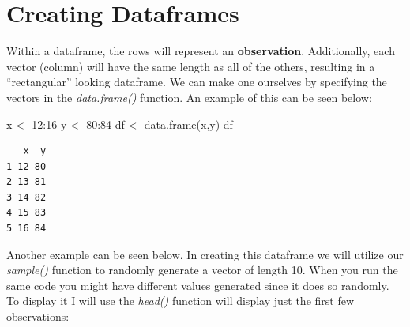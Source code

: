 \documentclass[
  letterpaper,
  DIV=11,
  numbers=noendperiod]{scrreprt}
\newenvironment{Shaded}{\begin{snugshade}}{\end{snugshade}}
\newcommand{\DecValTok}[1]{\textcolor[rgb]{0.68,0.00,0.00}{#1}}
\newcommand{\FunctionTok}[1]{\textcolor[rgb]{0.28,0.35,0.67}{#1}}
\newcommand{\NormalTok}[1]{\textcolor[rgb]{0.00,0.23,0.31}{#1}}
\newcommand{\OtherTok}[1]{\textcolor[rgb]{0.00,0.23,0.31}{#1}}
\newcommand{\SpecialCharTok}[1]{\textcolor[rgb]{0.37,0.37,0.37}{#1}}
\begin{document}
\section{Creating Dataframes}\label{creating-dataframes}

Within a dataframe, the rows will represent an \textbf{observation}.
Additionally, each vector (column) will have the same length as all of
the others, resulting in a ``rectangular'' looking dataframe. We can
make one ourselves by specifying the vectors in the \emph{data.frame()}
function. An example of this can be seen below:

\begin{Shaded}
\begin{Highlighting}[]
\NormalTok{x }\OtherTok{\textless{}{-}} \DecValTok{12}\SpecialCharTok{:}\DecValTok{16}
\NormalTok{y }\OtherTok{\textless{}{-}} \DecValTok{80}\SpecialCharTok{:}\DecValTok{84}
\NormalTok{df }\OtherTok{\textless{}{-}} \FunctionTok{data.frame}\NormalTok{(x,y)}
\NormalTok{df}
\end{Highlighting}
\end{Shaded}

\begin{verbatim}
   x  y
1 12 80
2 13 81
3 14 82
4 15 83
5 16 84
\end{verbatim}

Another example can be seen below. In creating this dataframe we will
utilize our \emph{sample()} function to randomly generate a vector of
length 10. When you run the same code you might have different values
generated since it does so randomly. To display it I will use the
\emph{head()} function will display just the first few observations:
\end{document}
